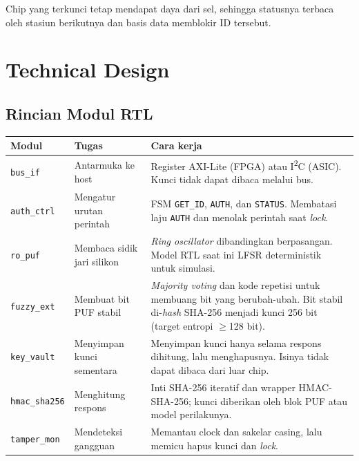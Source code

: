 \documentclass[11pt,a4paper]{article}
\newcommand{\hdr}[1]{\cellcolor{hdrgreen}\textbf{#1}}
\renewcommand{\arraystretch}{1.3}
\begin{document}
Chip yang terkunci tetap mendapat daya dari sel, sehingga statusnya terbaca oleh stasiun berikutnya dan basis data memblokir ID tersebut.

\section{Technical Design}

\subsection{Rincian Modul RTL}

\begin{center}
\footnotesize
\renewcommand{\arraystretch}{1.15}
\begin{tabularx}{\linewidth}{|>{\raggedright\arraybackslash}p{2.0cm}|>{\raggedright\arraybackslash}p{3.9cm}|X|}
\hline
\hdr{Modul} & \hdr{Tugas} & \hdr{Cara kerja} \\ \hline
\texttt{bus\_if} & Antarmuka ke host & Register AXI-Lite (FPGA) atau I\textsuperscript{2}C (ASIC). Kunci tidak dapat dibaca melalui bus. \\ \hline
\texttt{auth\_ctrl} & Mengatur urutan perintah & FSM \texttt{GET\_ID}, \texttt{AUTH}, dan \texttt{STATUS}. Membatasi laju \texttt{AUTH} dan menolak perintah saat \emph{lock}. \\ \hline
\texttt{ro\_puf} & Membaca sidik jari silikon & \emph{Ring oscillator} dibandingkan berpasangan. Model RTL saat ini LFSR deterministik untuk simulasi. \\ \hline
\texttt{fuzzy\_ext} & Membuat bit PUF stabil & \emph{Majority voting} dan kode repetisi untuk membuang bit yang berubah-ubah. Bit stabil di-\emph{hash} SHA-256 menjadi kunci 256 bit (target entropi $\geq$128 bit). \\ \hline
\texttt{key\_vault} & Menyimpan kunci sementara & Menyimpan kunci hanya selama respons dihitung, lalu menghapusnya. Isinya tidak dapat dibaca dari luar chip. \\ \hline
\texttt{hmac\_sha256} & Menghitung respons & Inti SHA-256 iteratif dan wrapper HMAC-SHA-256; kunci diberikan oleh blok PUF atau model perilakunya. \\ \hline
\texttt{tamper\_mon} & Mendeteksi gangguan & Memantau clock dan sakelar casing, lalu memicu hapus kunci dan \emph{lock}. \\ \hline
\end{tabularx}
\end{center}
\end{document}
